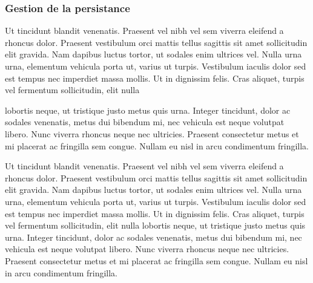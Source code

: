 \subsubsection{Gestion de la persistance}

Ut tincidunt blandit venenatis. Praesent vel nibh vel sem viverra eleifend a rhoncus dolor. Praesent vestibulum orci mattis tellus sagittis sit amet sollicitudin elit gravida. Nam dapibus luctus tortor, ut sodales enim ultrices vel. Nulla urna urna, elementum vehicula porta ut, varius ut turpis. Vestibulum iaculis dolor sed est tempus nec imperdiet massa mollis. Ut in dignissim felis. Cras aliquet, turpis vel fermentum sollicitudin, elit
nulla

lobortis neque, ut tristique justo metus quis urna. Integer tincidunt, dolor ac sodales venenatis, metus dui bibendum mi, nec vehicula est neque volutpat libero. Nunc viverra rhoncus neque nec ultricies. Praesent consectetur metus et mi placerat ac fringilla sem congue. Nullam eu nisl in arcu condimentum fringilla. 

Ut tincidunt blandit venenatis. Praesent vel nibh vel sem viverra eleifend a rhoncus dolor. Praesent vestibulum orci mattis tellus sagittis sit amet sollicitudin elit gravida. Nam dapibus luctus tortor, ut sodales enim ultrices vel. Nulla urna urna, elementum vehicula porta ut, varius ut turpis. Vestibulum iaculis dolor sed est tempus nec imperdiet massa mollis. Ut in dignissim felis. Cras aliquet, turpis vel fermentum sollicitudin, elit nulla lobortis neque, ut tristique justo metus quis urna. Integer tincidunt, dolor ac sodales venenatis, metus dui bibendum mi, nec vehicula est neque volutpat libero. Nunc viverra rhoncus neque nec ultricies. Praesent consectetur metus et mi placerat ac fringilla sem congue. Nullam eu nisl in arcu condimentum fringilla. 
